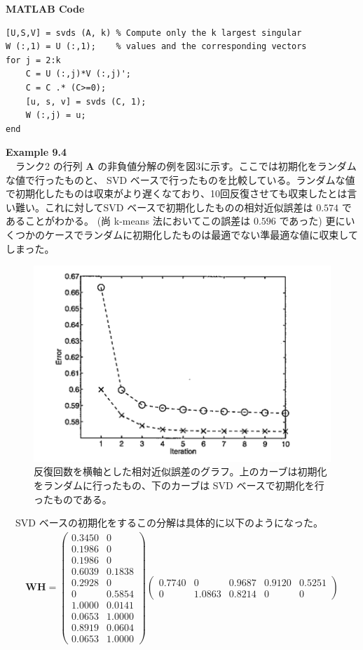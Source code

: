 \documentclass[a4paper,10pt]{jarticle}
\begin{document}
\textbf{MATLAB Code}\\
\begin{verbatim}
[U,S,V] = svds (A, k) % Compute only the k largest singular
W (:,1) = U (:,1);    % values and the corresponding vectors
for j = 2:k
    C = U (:,j)*V (:,j)';
    C = C .* (C>=0);
    [u, s, v] = svds (C, 1);
    W (:,j) = u;
end
\end{verbatim}

\textbf{Example 9.4}\\
　ランク2 の行列 \(\bm{A}\) の非負値分解の例を図3に示す。ここでは初期化をランダムな値で行ったものと、 SVD ベースで行ったものを比較している。ランダムな値で初期化したものは収束がより遅くなており、10回反復させても収束したとは言い難い。これに対してSVD ベースで初期化したものの相対近似誤差は \(0.574\) であることがわかる。 (尚 k-means 法においてこの誤差は \(0.596\) であった)  更にいくつかのケースでランダムに初期化したものは最適でない準最適な値に収束してしまった。\\

\begin{figure}[htbp]
\centering
\includegraphics[width=.9\linewidth]{../chapter9/fig9-3.png}
\caption{反復回数を横軸とした相対近似誤差のグラフ。上のカーブは初期化をランダムに行ったもの、下のカーブは SVD ベースで初期化を行ったものである。}
\end{figure}

　SVD ベースの初期化をするこの分解は具体的に以下のようになった。\\
\begin{align*}
\bm{W}\bm{H} = 
\begin{pmatrix}
0.3450 & 0 \\
0.1986 & 0 \\
0.1986 & 0 \\
0.6039 & 0.1838 \\
0.2928 & 0 \\
0 & 0.5854 \\
1.0000 & 0.0141 \\
0.0653 & 1.0000 \\
0.8919 & 0.0604 \\
0.0653 & 1.0000 
\end{pmatrix}
\begin{pmatrix}
0.7740 & 0 & 0.9687 & 0.9120 & 0.5251 \\
0 & 1.0863 & 0.8214 & 0 & 0
\end{pmatrix}
\end{align*}
\end{document}
